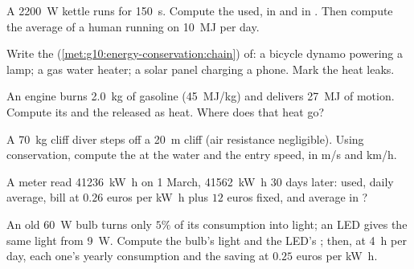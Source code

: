 \begin{exercise}[$\star$]\label{exo:g10:energy-conservation:4}
A \qty{2200}{W} kettle runs for \qty{150}{s}. Compute the 
used, in  and in . Then compute the average
 of a human running on \qty{10}{MJ} per day.
\end{exercise}

\begin{exercise}[$\star$]\label{exo:g10:energy-conservation:5}
Write the  (\cref{met:g10:energy-conservation:chain})
of: a bicycle dynamo powering a lamp; a gas water heater; a solar
panel charging a phone. Mark the heat leaks.
\end{exercise}

\begin{exercise}[$\star\star$]\label{exo:g10:energy-conservation:6}
An engine burns \qty{2.0}{kg} of gasoline (\qty{45}{MJ/kg}) and
delivers \qty{27}{MJ} of motion. Compute its  and the
 released as heat. Where does that heat go?
\end{exercise}

\begin{exercise}[$\star\star$]\label{exo:g10:energy-conservation:7}
A \qty{70}{kg} cliff diver steps off a \qty{20}{m} cliff (air
resistance negligible). Using conservation, compute the  at the water and the entry speed, in \unit{m/s} and \unit{km/h}.
\end{exercise}

\begin{exercise}[$\star\star$]\label{exo:g10:energy-conservation:8}
A meter read \qty{41236}{kW.h} on 1 March, \qty{41562}{kW.h} 30
days later:  used, daily average, bill at $0.26$ euros per
\unit{kW.h} plus $12$ euros fixed, and average  in ?
\end{exercise}

\begin{exercise}[$\star\star$]\label{exo:g10:energy-conservation:9}
An old \qty{60}{W} bulb turns only $5\%$ of its consumption into
light; an LED gives the same light from \qty{9}{W}. Compute the
bulb's light  and the LED's ; then, at \qty{4}{h} per
day, each one's yearly consumption and the saving at $0.25$ euros
per \unit{kW.h}.
\end{exercise}

